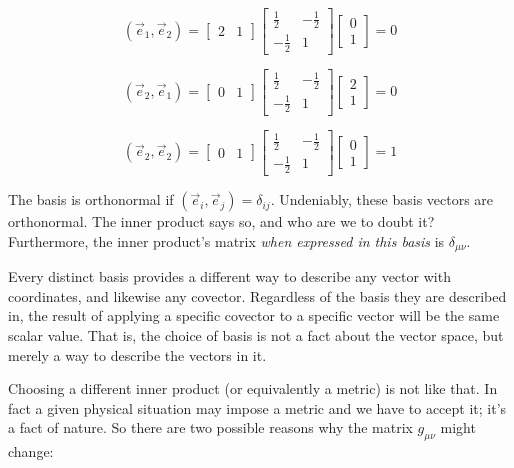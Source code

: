 $$
(\vec{e}_1, \vec{e}_2) =
\begin{bmatrix}
2 & 1
\end{bmatrix}
\begin{bmatrix}
\frac{1}{2} & -\frac{1}{2} \\
-\frac{1}{2} & 1
\end{bmatrix}
\begin{bmatrix}
0 \\ 1
\end{bmatrix}
= 0
$$    

$$
(\vec{e}_2, \vec{e}_1) =
\begin{bmatrix}
0 & 1
\end{bmatrix}
\begin{bmatrix}
\frac{1}{2} & -\frac{1}{2} \\
-\frac{1}{2} & 1
\end{bmatrix}
\begin{bmatrix}
2 \\ 1
\end{bmatrix}
= 0
$$    

$$
(\vec{e}_2, \vec{e}_2) =
\begin{bmatrix}
0 & 1
\end{bmatrix}
\begin{bmatrix}
\frac{1}{2} & -\frac{1}{2} \\
-\frac{1}{2} & 1
\end{bmatrix}
\begin{bmatrix}
0 \\ 1
\end{bmatrix}
= 1
$$    

The basis is orthonormal if $(\vec{e}_i, \vec{e}_j) = \delta_{ij}$. Undeniably, these basis vectors are orthonormal. The inner product says so, and who are we to doubt it? Furthermore, the inner product's matrix \textit{when expressed in this basis} is $\delta_{\mu\nu}$.

Every distinct basis provides a different way to describe any vector with coordinates, and likewise any covector. Regardless of the basis they are described in, the result of applying a specific covector to a specific vector will be the same scalar value. That is, the choice of basis is not a fact about the vector space, but merely a way to describe the vectors in it.

Choosing a different inner product (or equivalently a metric) is not like that. In fact a given physical situation may impose a metric and we have to accept it; it's a fact of nature. So there are two possible reasons why the matrix $g_{\mu\nu}$ might change:

